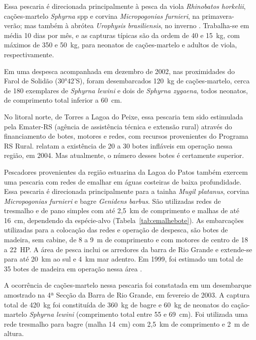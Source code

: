 \documentclass[a4paper,11pt,twoside,showtrims,onecolumn,openright,final]{memoir}
\begin{document}

Essa pescaria é direcionada principalmente à pesca da viola \emph{Rhinobatos horkelii}, 
cações-martelo \emph{Sphyrna} spp e corvina \emph{Micropogonias furnieri}, na primavera-verão; 
mas também à abrótea \emph{Urophysis brasiliensis}, 
no inverno \citep{peres2005a}. Trabalha-se em média 10 dias por mês, e as capturas típicas 
são da ordem de 40 e 15~kg, com máximos de 350 e 50~kg, para neonatos de cações-martelo 
e adultos de viola, respectivamente.

Em uma despesca acompanhada em dezembro de 2002, nas proximidades do Farol de Solidão (30°42'S), 
foram desembarcados 120~kg de cações-martelo, cerca de 180 exemplares de \emph{Sphyrna lewini} 
e dois de \emph{Sphyrna zygaena}, todos neonatos, de comprimento total inferior a 60~cm. 

No litoral norte, de Torres a Lagoa do Peixe, essa pescaria tem sido estimulada
pela Emater-RS (agência de assistência técnica e extensão rural) através do 
financiamento de botes, motores e redes, com recursos provenientes do 
Programa RS Rural. \citet{peres2005a} relatam a existência de 20 a 30 botes 
infláveis em operação nessa região, em 2004. Mas atualmente, o número desses botes é 
certamente superior.

Pescadores provenientes da região estuarina da Lagoa do Patos também exercem uma 
pescaria com redes de emalhar em águas costeiras de baixa profundidade. Essa pescaria 
é direcionada principalmente para a tainha \emph{Mugil platanus},
corvina \emph{Micropogonias furnieri} e bagre \emph{Genidens barbus}. 
São utilizadas redes de tresmalho e de pano simples com até 2,5~km de 
comprimento e malhas de até 16~cm, dependendo da espécie-alvo (Tabela~\ref{tab:emalhebote}). 
As embarcações utilizadas para a colocação das redes e operação de despesca, 
são botes de madeira, sem cabine, de 8 a 9~m de comprimento e com motores 
de centro de 18 a 22~HP. A área de pesca inclui os arredores da barra 
de Rio Grande e extende-se para até 20~km ao sul e 4~km mar adentro. 
Em 1999, foi estimado um total de 35 botes de madeira em operação nessa área \citep{gandra2000}.

A ocorrência de cações-martelo nessa pescaria foi constatada em um 
desembarque amostrado na 4ª Secção da Barra de Rio Grande,
em fevereio de 2003. A captura total de 420~kg foi constituída de 360~kg de bagre
e 60~kg de neonatos do cação-martelo \emph{Sphyrna lewini} (comprimento total entre 55 e 69~cm). 
Foi utilizada uma rede tresmalho para bagre (malha 14~cm) 
com 2,5~km de comprimento e 2~m de altura. 
\end{document}

